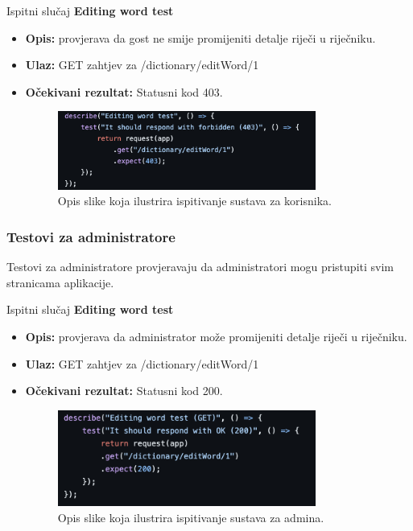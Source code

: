 			Ispitni slučaj \textbf{Editing word test}
			\begin{itemize}
				\item \textbf{Opis:} provjerava da gost ne smije promijeniti detalje riječi u riječniku.
				\item \textbf{Ulaz:} GET zahtjev za /dictionary/editWord/1
				\item \textbf{Očekivani rezultat:} Statusni kod 403.
				\begin{figure}[h]
					\centering
					\includegraphics[width=0.8\textwidth]{slike/testovi/user_edit_word_test.png}
					\caption{Opis slike koja ilustrira ispitivanje sustava za korisnika.}
					\label{fig:testovi_korisnik_slika}
				\end{figure}
			\end{itemize}

			\subsubsection{Testovi za administratore}
			Testovi za administratore provjeravaju da administratori mogu pristupiti svim stranicama aplikacije.

			Ispitni slučaj \textbf{Editing word test}
			\begin{itemize}
				\item \textbf{Opis:} provjerava da administrator može promijeniti detalje riječi u riječniku.
				\item \textbf{Ulaz:} GET zahtjev za /dictionary/editWord/1
				\item \textbf{Očekivani rezultat:} Statusni kod 200.
				\begin{figure}[h]
					\centering
					\includegraphics[width=0.8\textwidth]{slike/testovi/admin_edit_word_test.png}
					\caption{Opis slike koja ilustrira ispitivanje sustava za admina.}
					\label{fig:testovi_admin_slika}
				\end{figure}
			\end{itemize}


